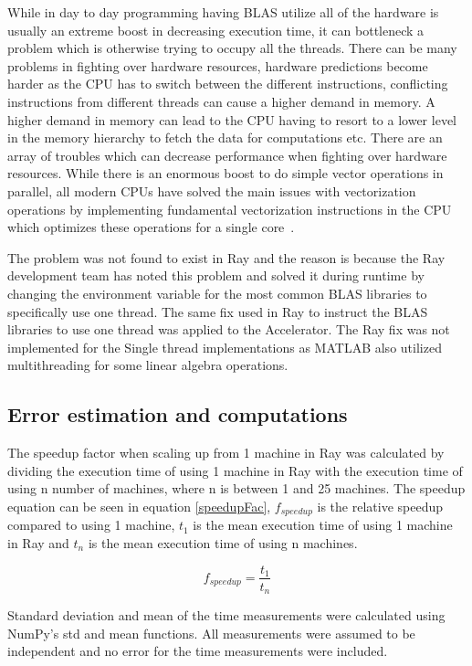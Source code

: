 \documentclass[12pt, a4paper]{article}
\begin{document}
While in day to day programming having BLAS utilize all of the hardware is usually an extreme boost in decreasing execution time, it can bottleneck a problem which is otherwise trying to occupy all the threads. 
There can be many problems in fighting over hardware resources, hardware predictions become harder as the CPU has to switch between the different instructions, conflicting instructions from different threads can cause a higher demand in memory.
A higher demand in memory can lead to the CPU having to resort to a lower level in the memory hierarchy to fetch the data for computations etc. 
There are an array of troubles which can decrease performance when fighting over hardware resources.
While there is an enormous boost to do simple vector operations in parallel, all modern CPUs have solved the main issues with vectorization operations by implementing fundamental vectorization instructions in the CPU which optimizes these operations for a single core~\cite{enwiki:avx}.

The problem was not found to exist in Ray and the reason is because the Ray development team has noted this problem and solved it during runtime by changing the environment variable for the most common BLAS libraries to specifically use one thread. 
The same fix used in Ray to instruct the BLAS libraries to use one thread was applied to the Accelerator.
The Ray fix was not implemented for the Single thread implementations as MATLAB also utilized multithreading for some linear algebra operations. 

\subsection{Error estimation and computations}

The speedup factor when scaling up from 1 machine in Ray was calculated by dividing the execution time of using 1 machine in Ray with the execution time of using n number of machines, where n is between 1 and 25 machines.
The speedup equation can be seen in equation \eqref{speedupFac}, $f_{speedup}$ is the relative speedup compared to using 1 machine, $t_1$ is the mean execution time of using 1 machine in Ray and $t_n$ is the mean execution time of using n machines.

\begin{equation}\label{speedupFac}
    f_{speedup} = \frac{t_1}{t_n}
\end{equation}

Standard deviation and mean of the time measurements were calculated using NumPy's std and mean functions.
All measurements were assumed to be independent and no error for the time measurements were included.
\end{document}
